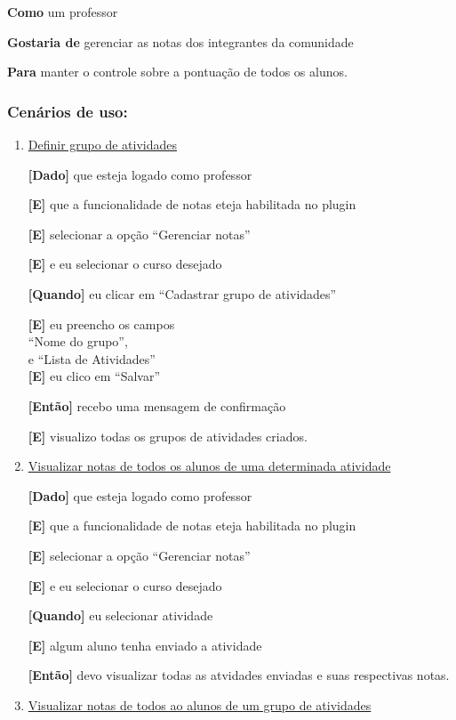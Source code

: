 \begin{enumerate}
\textbf{Como} um professor

\textbf{Gostaria de} gerenciar as notas dos integrantes da comunidade

\textbf{Para} manter o controle sobre a pontuação de todos os alunos.

\subsubsection*{Cenários de uso:}

\begin{enumerate}

\item \underline{Definir grupo de atividades}

\textbf{[Dado]} que esteja logado como professor

\textbf{[E]} que a funcionalidade de notas eteja habilitada no plugin

\textbf{[E]} selecionar a opção ``Gerenciar notas''

\textbf{[E]} e eu selecionar o curso desejado

\textbf{[Quando]} eu clicar em ``Cadastrar grupo de atividades''

\textbf{[E]} eu preencho os campos \\
``Nome do grupo'',\\
e ``Lista de Atividades''\\
\textbf{[E]} eu clico em ``Salvar''

\textbf{[Então]} recebo uma mensagem de confirmação

\textbf{[E]} visualizo todas os grupos de atividades criados.

\item \underline{Visualizar notas de todos os alunos de uma determinada atividade}

\textbf{[Dado]} que esteja logado como professor

\textbf{[E]} que a funcionalidade de notas eteja habilitada no plugin

\textbf{[E]} selecionar a opção ``Gerenciar notas''

\textbf{[E]} e eu selecionar o curso desejado

\textbf{[Quando]} eu selecionar atividade

\textbf{[E]} algum aluno tenha enviado a atividade

\textbf{[Então]} devo visualizar todas as atvidades enviadas e suas respectivas notas.

\item \underline{Visualizar notas de todos ao alunos de um grupo de atividades}


\end{enumerate}
\end{enumerate}
